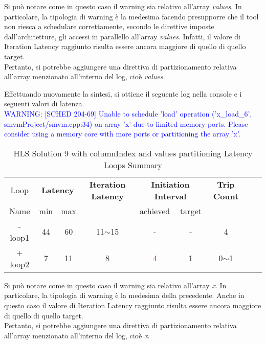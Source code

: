 Si può notare come in questo caso il warning sia relativo all'array \textit{values}. In particolare, la tipologia di warning è la medesima facendo presupporre che il tool non riesca a schedulare correttamente, secondo le direttive imposte dall'architetture, gli accessi in parallello all'array \textit{values}. Infatti, il valore di Iteration Latency raggiunto risulta essere ancora maggiore di quello di quello target. 
\\
Pertanto, si potrebbe aggiungere una direttiva di partizionamento relativa all'array menzionato all'interno del log, cioè \textit{values}.



Effettuando nuovamente la sintesi, si ottiene il seguente log nella console e i seguenti valori di latenza.
\\
\textcolor{blue}{WARNING: [SCHED 204-69] Unable to schedule 'load' operation ('x\_load\_6', smvmProject/smvm.cpp:34) on array 'x' due to limited memory ports. Please consider using a memory core with more ports or partitioning the array 'x'.}

\begin{table}[H]
	\centering
	\begin{tabular}{|c|c|c|c|c|c|c|c|c|}
		\hline
		\multicolumn{1}{|c|}{Loop} & \multicolumn{2}{|c|}{\textbf{Latency}} & \multicolumn{1}{c|}{\textbf{Iteration Latency}} & \multicolumn{2}{c|}{\textbf{Initiation Interval}} & \multicolumn{1}{c|}{\textbf{Trip Count}}  \\
		Name & min & max &  & achieved & target &  \\
		\hline
		- loop1 & 44 & 60 & 11$\sim$15 & - & - & 4 \\
		+ loop2 & 7 & 11 & 8 & \textcolor{red}{4} & 1 & 0$\sim$1 \\
		\hline
	\end{tabular}
	\caption{HLS Solution 9 with columnIndex and values partitioning Latency Loops Summary}
	\label{tab:hls-solution-9-columnindex-values-partitioning-loop-summary}
\end{table}

Si può notare come in questo caso il warning sia relativo all'array \textit{x}. In particolare, la tipologia di warning è la medesima della precedente. Anche in questo caso il valore di Iteration Latency raggiunto risulta essere ancora maggiore di quello di quello target. 
\\
Pertanto, si potrebbe aggiungere una direttiva di partizionamento relativa all'array menzionato all'interno del log, cioè \textit{x}.

